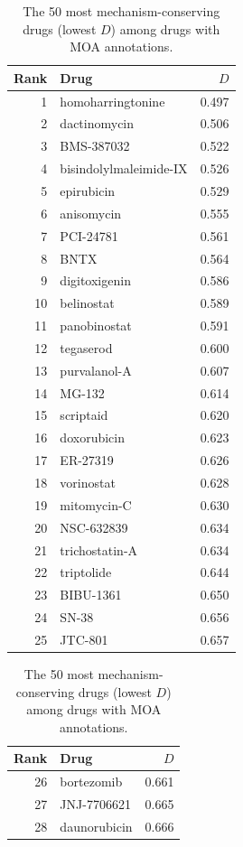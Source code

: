 \documentclass[11pt]{article}
\begin{document}
\begin{table}[h]
\centering
\caption{The 50 most mechanism-conserving drugs (lowest $D$) among drugs
with MOA annotations.}
\label{tab:top50}
\small
\begin{minipage}[t]{0.48\textwidth}
\centering
\begin{tabular}{@{}rlr@{}}
\toprule
Rank & Drug & $D$ \\
\midrule
1 & homoharringtonine & 0.497 \\
2 & dactinomycin & 0.506 \\
3 & BMS-387032 & 0.522 \\
4 & bisindolylmaleimide-IX & 0.526 \\
5 & epirubicin & 0.529 \\
6 & anisomycin & 0.555 \\
7 & PCI-24781 & 0.561 \\
8 & BNTX & 0.564 \\
9 & digitoxigenin & 0.586 \\
10 & belinostat & 0.589 \\
11 & panobinostat & 0.591 \\
12 & tegaserod & 0.600 \\
13 & purvalanol-A & 0.607 \\
14 & MG-132 & 0.614 \\
15 & scriptaid & 0.620 \\
16 & doxorubicin & 0.623 \\
17 & ER-27319 & 0.626 \\
18 & vorinostat & 0.628 \\
19 & mitomycin-C & 0.630 \\
20 & NSC-632839 & 0.634 \\
21 & trichostatin-A & 0.634 \\
22 & triptolide & 0.644 \\
23 & BIBU-1361 & 0.650 \\
24 & SN-38 & 0.656 \\
25 & JTC-801 & 0.657 \\
\bottomrule
\end{tabular}
\end{minipage}%
\hfill
\begin{minipage}[t]{0.48\textwidth}
\centering
\begin{tabular}{@{}rlr@{}}
\toprule
Rank & Drug & $D$ \\
\midrule
26 & bortezomib & 0.661 \\
27 & JNJ-7706621 & 0.665 \\
28 & daunorubicin & 0.666 \\

\end{tabular}
\end{minipage}
\end{table}
\end{document}
